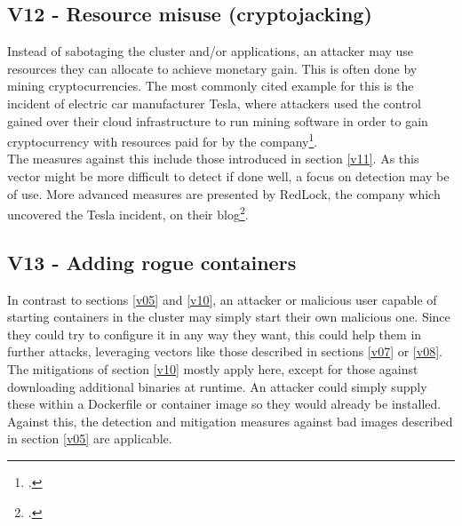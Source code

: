 \subsection{V12 - Resource misuse (cryptojacking)}
Instead of sabotaging the cluster and/or applications, an attacker may use resources they can allocate to achieve monetary gain. This is often done by mining cryptocurrencies. The most commonly cited example for this is the incident of electric car manufacturer Tesla, where attackers used the control gained over their cloud infrastructure to run mining software in order to gain cryptocurrency with resources paid for by the company\footcite[][, section 'The Latest Victim: Tesla']{teslaIncident}. \\
The measures against this include those introduced in section \ref{v11}. As this vector might be more difficult to detect if done well, a focus on detection may be of use.
More advanced measures are presented by RedLock, the company which uncovered the Tesla incident, on their blog\footcite[][, section 'Preventing Such Compromises']{teslaIncident}.

\subsection{V13 - Adding rogue containers} \label{v13}
\vspace{-0.25cm}
In contrast to sections \ref{v05} and \ref{v10}, an attacker or malicious user capable of starting containers in the cluster may simply start their own malicious one. Since they could try to configure it in any way they want, this could help them in further attacks, leveraging vectors like those described in sections \ref{v07} or \ref{v08}. \\
The mitigations of section \ref{v10} mostly apply here, except for those against downloading additional binaries at runtime. An attacker could simply supply these within a Dockerfile or container image so they would already be installed. Against this, the detection and mitigation measures against bad images described in section \ref{v05} are applicable.

\vspace{-0.25cm}

